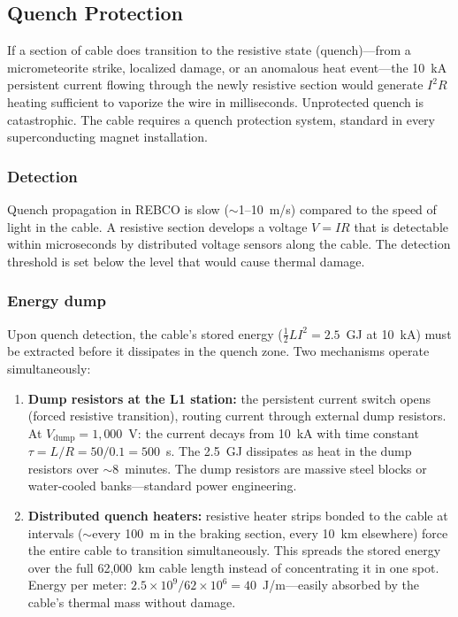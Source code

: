 \documentclass[12pt,letterpaper]{article}
\begin{document}
\subsection{Quench Protection}

If a section of cable does transition to the resistive state (quench)---from a micrometeorite strike, localized damage, or an anomalous heat event---the 10~kA persistent current flowing through the newly resistive section would generate $I^2 R$ heating sufficient to vaporize the wire in milliseconds. Unprotected quench is catastrophic. The cable requires a quench protection system, standard in every superconducting magnet installation.

\subsubsection{Detection}

Quench propagation in REBCO is slow ($\sim$1--10~m/s) compared to the speed of light in the cable. A resistive section develops a voltage $V = IR$ that is detectable within microseconds by distributed voltage sensors along the cable. The detection threshold is set below the level that would cause thermal damage.

\subsubsection{Energy dump}

Upon quench detection, the cable's stored energy ($\frac{1}{2}LI^2 = 2.5$~GJ at 10~kA) must be extracted before it dissipates in the quench zone. Two mechanisms operate simultaneously:

\begin{enumerate}[label=(\roman*)]
\item \textbf{Dump resistors at the L1 station:} the persistent current switch opens (forced resistive transition), routing current through external dump resistors. At $V_{\text{dump}} = 1{,}000$~V: the current decays from 10~kA with time constant $\tau = L/R = 50/0.1 = 500$~s. The 2.5~GJ dissipates as heat in the dump resistors over $\sim$8~minutes. The dump resistors are massive steel blocks or water-cooled banks---standard power engineering.

\item \textbf{Distributed quench heaters:} resistive heater strips bonded to the cable at intervals ($\sim$every 100~m in the braking section, every 10~km elsewhere) force the entire cable to transition simultaneously. This spreads the stored energy over the full 62,000~km cable length instead of concentrating it in one spot. Energy per meter: $2.5 \times 10^9 / 62 \times 10^6 = 40$~J/m---easily absorbed by the cable's thermal mass without damage.
\end{enumerate}
\end{document}
